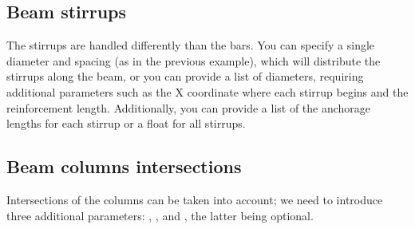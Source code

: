 \documentclass[a4paper,10pt,english]{sphinxmanual}
\begin{document}
\subsection{Beam stirrups}
\label{\detokenize{usage:beam-stirrups}}\label{\detokenize{usage:beam-stirrups-label}}
\sphinxAtStartPar
The stirrups are handled differently than the bars. You can specify a single diameter and spacing (as in the previous
example), which will distribute the stirrups along the beam, or you can provide a list of diameters, requiring
additional parameters such as the X coordinate where each stirrup begins and the reinforcement length. Additionally,
you can provide a list of the anchorage lengths for each stirrup or a float for all stirrups.

\begin{sphinxVerbatim}[commandchars=\\\{\}]
  
               
               
            \PYG{p}{[}  \PYG{p}{]}
            \PYG{p}{[}  \PYG{p}{]}
            \PYG{p}{[}  \PYG{p}{]}
            \PYG{p}{[}  \PYG{p}{]}
\end{sphinxVerbatim}


\subsection{Beam columns intersections}
\label{\detokenize{usage:beam-columns-intersections}}
\sphinxAtStartPar
Intersections of the columns can be taken into account; we need to introduce three additional parameters:
, , and , the latter being optional.
\end{document}
